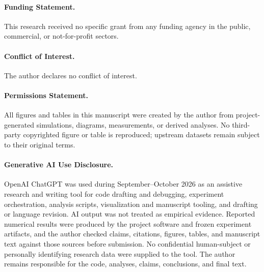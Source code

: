 \documentclass[acmtog]{acmart}
\begin{document}
\paragraph{Funding Statement.}
This research received no specific grant from any funding agency in the public, commercial, or not-for-profit sectors.

\paragraph{Conflict of Interest.}
The author declares no conflict of interest.

\paragraph{Permissions Statement.}
All figures and tables in this manuscript were created by the author from project-generated simulations, diagrams, measurements, or derived analyses. No third-party copyrighted figure or table is reproduced; upstream datasets remain subject to their original terms.

\paragraph{Generative AI Use Disclosure.}
OpenAI ChatGPT was used during September--October 2026 as an assistive research and writing tool for code drafting and debugging, experiment orchestration, analysis scripts, visualization and manuscript tooling, and drafting or language revision. AI output was not treated as empirical evidence. Reported numerical results were produced by the project software and frozen experiment artifacts, and the author checked claims, citations, figures, tables, and manuscript text against those sources before submission. No confidential human-subject or personally identifying research data were supplied to the tool. The author remains responsible for the code, analyses, claims, conclusions, and final text.



\end{document}
